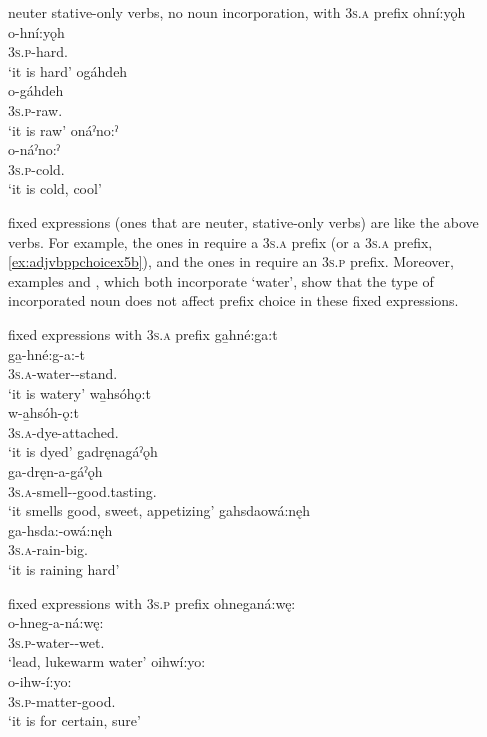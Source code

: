 \ea\label{ex:adjvbppchoicex4} neuter stative-only verbs, no noun incorporation, with  \textsc{3s.a} prefix
\ea ohní:yǫh\\
\gll o-hní:yǫh\\
 \textsc{3s.p}-hard.{\stative}\\
\glt `it is hard'
\ex ogáhdeh\\
\gll o-gáhdeh\\
 \textsc{3s.p}-raw.{\stative}\\
\glt `it is raw'
\ex onáˀno:ˀ\\
\gll o-náˀno:ˀ\\
 \textsc{3s.p}-cold.{\stative}\\
\glt `it is cold, cool'
\z
\z

 fixed expressions (ones that are neuter, stative-only verbs) are like the above verbs. For example, the ones in  require a  \textsc{3s.a} prefix (or a  \textsc{3s.a} prefix, \ref{ex:adjvbppchoicex5b}), and the ones in  require an  \textsc{3s.p} prefix. Moreover, examples  and , which both incorporate  ‘water’, show that the type of incorporated noun does not affect prefix choice in these  fixed expressions.

\ea\label{ex:adjvbppchoicex5}  fixed expressions with  \textsc{3s.a} prefix
\ea ga̱hné:ga:t\\\label{ex:adjvbppchoicex5a}
\gll ga̱-hné:g-a:-t\\
 \textsc{3s.a}-water-{\joinerA}-stand.{\stative}\\
\glt `it is watery'
\ex wa̱hsóhǫ:t\\\label{ex:adjvbppchoicex5b}
\gll w-a̱hsóh-ǫ:t \\
 \textsc{3s.a}-dye-attached.{\stative}\\
\glt `it is dyed'
\ex gadręnagáˀǫh\\\label{ex:adjvbppchoicex5c}
\gll ga-dręn-a-gáˀǫh\\
 \textsc{3s.a}-smell-{\joinerA}-good.tasting.{\stative}\\
\glt `it smells good, sweet, appetizing'
\ex gahsdaowá:nęh\\\label{ex:adjvbppchoicex5d}
\gll ga-hsda:-owá:nęh\\
 \textsc{3s.a}-rain-big.{\stative}\\
\glt `it is raining hard'
\z
\z

\ea\label{ex:adjvbppchoicex6}  fixed expressions with  \textsc{3s.p} prefix
\ea ohneganá:wę:\\\label{ex:adjvbppchoicex6a}
\gll o-hneg-a-ná:wę:\\
 \textsc{3s.p}-water-{\joinerA}-wet.{\stative}\\
\glt `lead, lukewarm water'
\ex oihwí:yo:\\\label{ex:adjvbppchoicex6b}
\gll o-ihw-í:yo:\\
 \textsc{3s.p}-matter-good.{\stative}\\
\glt `it is for certain, sure'
\z
\z

